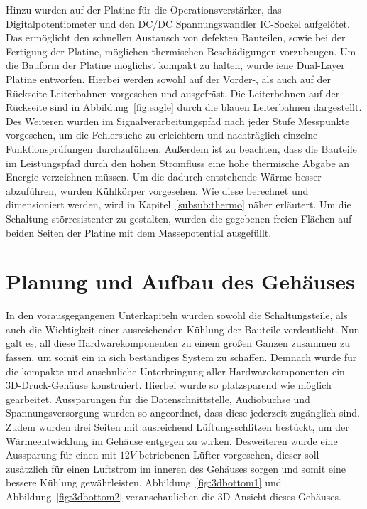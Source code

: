 Hinzu wurden auf der Platine für die Operationsverstärker, das Digitalpotentiometer und den DC/DC Spannungswandler IC-Sockel aufgelötet. Das ermöglicht den schnellen Austausch von defekten Bauteilen, sowie bei der Fertigung der Platine, möglichen thermischen Beschädigungen vorzubeugen. Um die Bauform der Platine möglichst kompakt zu halten, wurde iene Dual-Layer Platine entworfen. Hierbei werden sowohl auf der Vorder-, als auch auf der Rückseite Leiterbahnen vorgesehen und ausgefräst. Die Leiterbahnen auf der Rückseite sind in Abbildung~\ref{fig:eagle} durch die blauen Leiterbahnen dargestellt. Des Weiteren wurden im Signalverarbeitungspfad nach jeder Stufe Messpunkte vorgesehen, um die Fehlersuche zu erleichtern und nachträglich einzelne Funktionsprüfungen durchzuführen. Außerdem ist zu beachten, dass die Bauteile im Leistungspfad durch den hohen Stromfluss eine hohe thermische Abgabe an Energie verzeichnen müssen. Um die dadurch entstehende Wärme besser abzuführen, wurden Kühlkörper vorgesehen. Wie diese berechnet und dimensioniert werden, wird in Kapitel~\ref{subsub:thermo} näher erläutert. Um die Schaltung störresistenter zu gestalten, wurden die gegebenen freien Flächen auf beiden Seiten der Platine mit dem Massepotential ausgefüllt. 

\newpage
\section{Planung und Aufbau des Gehäuses}
\label{sec:geh}

In den vorausgegangenen Unterkapiteln wurden sowohl die Schaltungsteile, als auch die Wichtigkeit einer ausreichenden Kühlung der Bauteile verdeutlicht. Nun galt es, all diese Hardwarekomponenten zu einem großen Ganzen zusammen zu fassen, um somit ein in sich beständiges System zu schaffen. Demnach wurde für die kompakte und ansehnliche Unterbringung aller Hardwarekomponenten ein 3D-Druck-Gehäuse konstruiert. Hierbei wurde so platzsparend wie möglich gearbeitet. Aussparungen für die Datenschnittstelle, Audiobuchse und Spannungsversorgung wurden so angeordnet, dass diese jederzeit zugänglich sind. Zudem wurden drei Seiten mit ausreichend Lüftungsschlitzen bestückt, um der Wärmeentwicklung im Gehäuse entgegen zu wirken. Desweiteren wurde eine Aussparung für einen mit $12V$ betriebenen Lüfter vorgesehen, dieser soll zusätzlich für einen Luftstrom im inneren des Gehäuses sorgen und somit eine bessere Kühlung gewährleisten. Abbildung~\ref{fig:3dbottom1} und Abbildung~\ref{fig:3dbottom2} veranschaulichen die 3D-Ansicht dieses Gehäuses.


